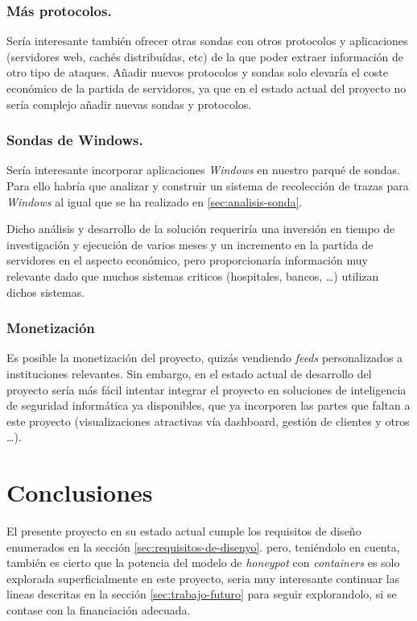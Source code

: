 \subsubsection{Más protocolos.}

Sería interesante también ofrecer otras sondas con otros protocolos y aplicaciones (servidores web, cachés distribuídas, etc) de la que poder extraer información de otro
tipo de ataques. Añadir nuevos protocolos y sondas solo elevaría el coste económico de la partida de servidores, ya que en el estado actual del proyecto no sería 
complejo añadir nuevas sondas y protocolos.

\subsubsection{Sondas de Windows.}

Sería interesante incorporar aplicaciones \emph{Windows} en nuestro parqué de sondas. Para ello habría que analizar y construir un sistema de recolección de trazas
para \emph{Windows} al igual que se ha realizado en \ref{sec:analisis-sonda}.

Dicho análisis y desarrollo de la solución requeriría una inversión en tiempo de investigación y ejecución de varios meses y un incremento en la partida de servidores en el aspecto económico, 
pero proporcionaría información muy relevante dado que muchos sistemas criticos (hospitales, bancos, \ldots) utilizan dichos sistemas.


\subsubsection{Monetización}

Es posible la monetización del proyecto, quizás vendiendo \emph{feeds} personalizados a instituciones relevantes. Sin embargo, en el estado actual de desarrollo del proyecto
sería más fácil intentar integrar el proyecto en soluciones de inteligencia de seguridad informática ya disponibles, que ya incorporen las partes que faltan a este proyecto
(visualizaciones atractivas vía dashboard, gestión de clientes y otros \ldots).

\section{Conclusiones}

El presente proyecto en su estado actual cumple los requisitos de diseño enumerados en la sección \ref{sec:requisitos-de-disenyo}. pero, teniéndolo en cuenta, también es cierto que la potencia del modelo de \emph{honeypot} con \emph{containers} es solo explorada superficialmente en este proyecto, seria muy interesante continuar
las lineas descritas en la sección \ref{sec:trabajo-futuro} para seguir explorandolo, si se contase con la financiación adecuada.

